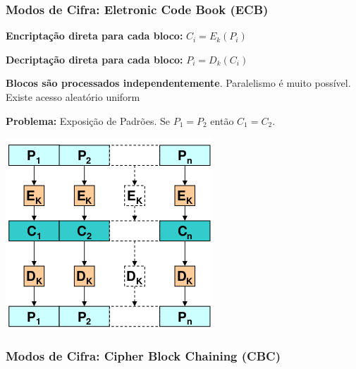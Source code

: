 \documentclass{article}
\begin{document}
\subsubsection{Modos de Cifra: Eletronic Code Book (ECB)}

\begin{flushleft}
  \textbf{Encriptação direta para cada bloco:} $C_i = E_k(P_i)$

  \vspace{2mm}

  \textbf{Decriptação direta para cada bloco:} $P_i = D_k(C_i)$

  \vspace{2mm}

  \textbf{Blocos são processados independentemente}. Paralelismo é muito
  possível. Existe acesso aleatório uniform

  \vspace{2mm}

  \textbf{Problema:} Exposição de Padrões. Se $P_1 = P_2$ então $C_1 = C_2$.
\end{flushleft}

\begin{center}
  \includegraphics[scale=0.3]{82}
\end{center}

\pagebreak

\subsubsection{Modos de Cifra: Cipher Block Chaining (CBC)}
\end{document}
